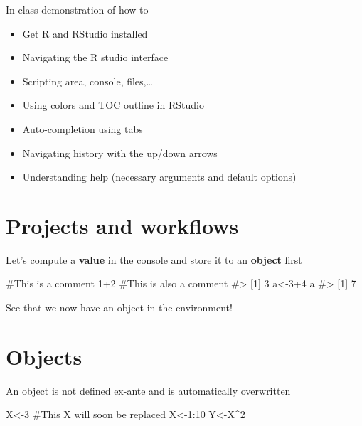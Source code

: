 \documentclass[
  letterpaper,
  DIV=11,
  numbers=noendperiod]{scrreprt}
\newenvironment{Shaded}{\begin{snugshade}}{\end{snugshade}}
\newcommand{\CommentTok}[1]{\textcolor[rgb]{0.37,0.37,0.37}{#1}}
\newcommand{\DecValTok}[1]{\textcolor[rgb]{0.68,0.00,0.00}{#1}}
\newcommand{\NormalTok}[1]{\textcolor[rgb]{0.00,0.23,0.31}{#1}}
\newcommand{\OtherTok}[1]{\textcolor[rgb]{0.00,0.23,0.31}{#1}}
\newcommand{\SpecialCharTok}[1]{\textcolor[rgb]{0.37,0.37,0.37}{#1}}
\providecommand{\tightlist}{%
  \setlength{\itemsep}{0pt}\setlength{\parskip}{0pt}}\usepackage{longtable,booktabs,array}
\begin{document}
In class demonstration of how to

\begin{itemize}
\tightlist
\item
  Get R and RStudio installed
\item
  Navigating the R studio interface
\item
  Scripting area, console, files,\ldots{}
\item
  Using colors and TOC outline in RStudio
\item
  Auto-completion using tabs
\item
  Navigating history with the up/down arrows
\item
  Understanding help (necessary arguments and default options)
\end{itemize}

\section{Projects and workflows}\label{projects-and-workflows}

Let's compute a \textbf{value} in the console and store it to an
\textbf{object} first

\begin{Shaded}
\begin{Highlighting}[]
\CommentTok{\#This is a comment}
\DecValTok{1}\SpecialCharTok{+}\DecValTok{2} \CommentTok{\#This is also a comment}
\CommentTok{\#\textgreater{} [1] 3}
\NormalTok{a}\OtherTok{\textless{}{-}}\DecValTok{3}\SpecialCharTok{+}\DecValTok{4}
\NormalTok{a}
\CommentTok{\#\textgreater{} [1] 7}
\end{Highlighting}
\end{Shaded}

See that we now have an object in the environment!

\section{Objects}\label{objects}

An object is not defined ex-ante and is automatically overwritten

\begin{Shaded}
\begin{Highlighting}[]
\NormalTok{X}\OtherTok{\textless{}{-}}\DecValTok{3} \CommentTok{\#This X will soon be replaced}
\NormalTok{X}\OtherTok{\textless{}{-}}\DecValTok{1}\SpecialCharTok{:}\DecValTok{10} 
\NormalTok{Y}\OtherTok{\textless{}{-}}\NormalTok{X}\SpecialCharTok{\^{}}\DecValTok{2}
\end{Highlighting}
\end{Shaded}
\end{document}

